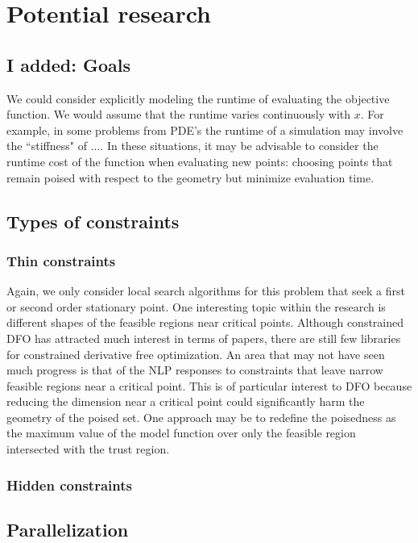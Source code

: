\documentclass{article}
\begin{document}
\section{Potential research}
\subsection{I added: Goals}

We could consider explicitly modeling the runtime of evaluating the objective function.
We would assume that the runtime varies continuously with $x$.
For example, in some problems from PDE's the runtime of a simulation may involve the ``stiffness" of $\ldots$.
In these situations, it may be advisable to consider the runtime cost of the function when evaluating new points:
choosing points that remain poised with respect to the geometry but minimize evaluation time.

\subsection{Types of constraints}

\subsubsection{Thin constraints}
Again, we only consider local search algorithms for this problem that seek a first or second order stationary point.
One interesting topic within the research is different shapes of the feasible regions near critical points.
Although constrained DFO has attracted much interest in terms of papers, there are still few libraries for constrained derivative free optimization.
An area that may not have seen much progress is that of the NLP responses to constraints that leave narrow feasible regions near a critical point.
This is of particular interest to DFO because reducing the dimension near a critical point could significantly harm the geometry of the poised set.
One approach may be to redefine the poisedness as the maximum value of the model function over only the feasible region intersected with the trust region.

\subsubsection{Hidden constraints}

\subsection{Parallelization}
\end{document}
